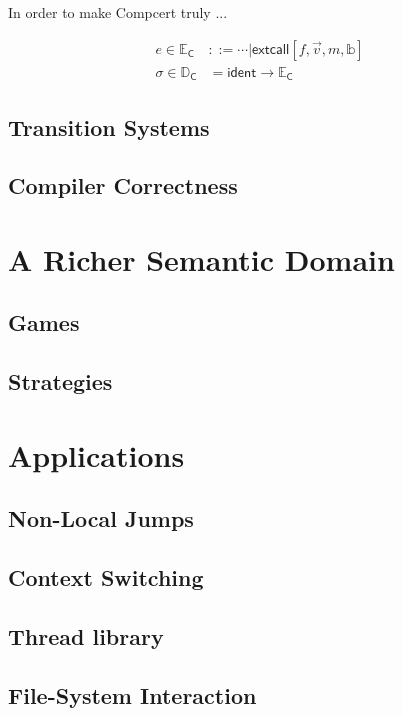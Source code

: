 \documentclass[sigplan,10pt,review,anonymous]{acmart}
\newcommand{\kw}[1]{\ensuremath{ \textsf{#1} }}
\begin{document}
In order to make Compcert truly ...

\begin{align*}
  e \in \mathbb{E}_\kw{C} &::=
    \cdots | \kw{extcall}[f, \vec{v}, m, \mathbb{b}] \\
  \sigma \in \mathbb{D}_\kw{C} &=
    \kw{ident} \rightarrow \mathbb{E}_\kw{C}
\end{align*}

\subsection{Transition Systems}
\subsection{Compiler Correctness}


\section{A Richer Semantic Domain} %

\subsection{Games}
\subsection{Strategies}



\section{Applications} %

\subsection{Non-Local Jumps}
\subsection{Context Switching}
\subsection{Thread library}
\subsection{File-System Interaction}
\end{document}
